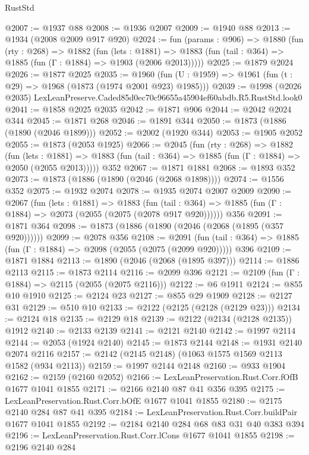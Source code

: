 \begin{lexlean}{RustStd}
\begin{coremodule}
@2007 := @1937 @88
@2008 := @1936 @2007
@2009 := @1940 @88
@2013 := @1934 (@2008 @2009 @917 @920)
@2024 := fun (params : @906) =>
  @1880
    (fun (rty : @268) =>
    @1882
      (fun (lets : @1881) =>
      @1883 (fun (tail : @364) => @1885 (fun (Γ : @1884) => @1903 (@2006 @2013)))))
@2025 := @1879 @2024
@2026 := @1877 @2025
@2035 := @1960 (fun (U : @1959) => @1961 (fun (t : @29) => @1968 (@1873 (@1974 @2001 @923) @1985)))
@2039 := @1998 (@2026 @2035) LexLeanPreserve.Caded85d0ec70c96655a45904ef60abdb.R5.RustStd.look0
@2041 := @1858 @2025 @2035
@2042 := @1871 @906
@2044 := @2042 @2024 @344
@2045 := @1871 @268
@2046 := @1891 @344
@2050 := @1873 (@1886 (@1890 (@2046 @1899)))
@2052 := @2002 (@1920 @344)
@2053 := @1905 @2052
@2055 := @1873 (@2053 @1925)
@2066 := @2045
    (fun (rty : @268) =>
    @1882
      (fun (lets : @1881) =>
      @1883 (fun (tail : @364) => @1885 (fun (Γ : @1884) => @2050 (@2055 @2013)))))
    @352
@2067 := @1871 @1881
@2068 := @1893 @352
@2073 := @1873 (@1886 (@1890 (@2046 (@2068 @1898))))
@2074 := @1556 @352
@2075 := @1932 @2074
@2078 := @1935 @2074 @2007 @2009
@2090 := @2067
    (fun (lets : @1881) =>
    @1883 (fun (tail : @364) => @1885 (fun (Γ : @1884) => @2073 (@2055 (@2075 (@2078 @917 @920))))))
    @356
@2091 := @1871 @364
@2098 := @1873 (@1886 (@1890 (@2046 (@2068 (@1895 (@357 @920))))))
@2099 := @2078 @356
@2108 := @2091
    (fun (tail : @364) => @1885 (fun (Γ : @1884) => @2098 (@2055 (@2075 (@2099 @920)))))
    @396
@2109 := @1871 @1884
@2113 := @1890 (@2046 (@2068 (@1895 @397)))
@2114 := @1886 @2113
@2115 := @1873 @2114
@2116 := @2099 @396
@2121 := @2109 (fun (Γ : @1884) => @2115 (@2055 (@2075 @2116)))
@2122 := @6 @1911
@2124 := @855 @10 @1910
@2125 := @2124 @23
@2127 := @855 @29 @1909
@2128 := @2127 @31
@2129 := @510 @10
@2133 := @2122 (@2125 (@2128 (@2129 @23)))
@2134 := @2124 @18
@2135 := @2129 @18
@2139 := @2122 (@2134 (@2128 @2135)) @1912
@2140 := @2133 @2139
@2141 := @2121 @2140
@2142 := @1997 @2114
@2144 := @2053 (@1924 @2140)
@2145 := @1873 @2144
@2148 := @1931 @2140 @2074 @2116
@2157 := @2142 (@2145 @2148) (@1063 @1575 @1569 @2113 @1582 (@934 @2113))
@2159 := @1997 @2144 @2148
@2160 := @933 @1904
@2162 := @2159 (@2160 @2052)
@2166 := LexLeanPreservation.Rust.Corr.fOfB @1677 @1041 @1855
@2171 := @2166 @2140 @87 @41 @356 @395
@2175 := LexLeanPreservation.Rust.Corr.bOfE @1677 @1041 @1855
@2180 := @2175 @2140 @284 @87 @41 @395
@2184 := LexLeanPreservation.Rust.Corr.buildPair @1677 @1041 @1855
@2192 := @2184 @2140 @284 @68 @83 @31 @40 @383 @394
@2196 := LexLeanPreservation.Rust.Corr.lCons @1677 @1041 @1855
@2198 := @2196 @2140 @284

\end{coremodule}
\end{lexlean}
